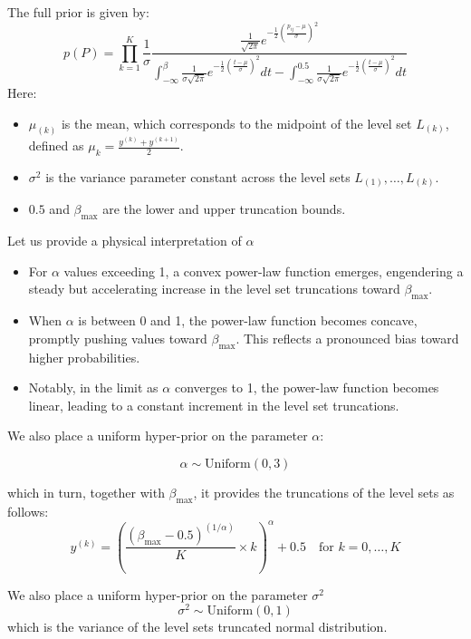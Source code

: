 \documentclass[11pt]{amsart}
\begin{document}
The full prior is given by:
\[
p(P) = \prod_{k=1}^K \frac{1}{\sigma} \frac{\frac{1}{\sqrt{2\pi}} e^{-\frac{1}{2}\left(\frac{p_{ij} - \mu}{\sigma}\right)^2}}{\int_{-\infty}^\beta \frac{1}{\sigma\sqrt{2\pi}} e^{-\frac{1}{2}\left(\frac{t- \mu}{\sigma}\right)^2 }dt -\int_{-\infty}^{0.5} \frac{1}{\sigma\sqrt{2\pi}} e^{-\frac{1}{2}\left(\frac{t- \mu}{\sigma}\right)^2 }dt}
\]
Here:
\begin{itemize}
\item $\mu_{(k)}$ is the mean, which corresponds to the midpoint of the level set $L_{(k)}$, defined as $\mu_{k} = \frac{y^{(k)}+y^{(k+1)}}{2}$.
\item $\sigma^{2}$ is the variance parameter constant across the level sets $L_{(1)},\ldots,L_{(k)}$.
\item $0.5$ and $\beta_{\max}$ are the lower and upper truncation bounds.
\end{itemize}

Let us provide a physical interpretation of $\alpha$
\begin{itemize}
    \item For \(\alpha\) values exceeding 1, a convex power-law function emerges, engendering a steady but accelerating increase in the level set truncations toward \(\beta_{\max}\).
    
    \item When \(\alpha\) is between 0 and 1, the power-law function becomes concave, promptly pushing values toward \(\beta_{\max}\). This reflects a pronounced bias toward higher probabilities.
    
    \item Notably, in the limit as \(\alpha\) converges to 1, the power-law function becomes linear, leading to a constant increment in the level set truncations.
\end{itemize}




We also place a uniform hyper-prior on the parameter $\alpha$:

\[
\alpha \sim \text{Uniform}(0, 3)
\]

which in turn, together with $\beta_{\max}$, it provides the truncations of the level sets as follows:
\begin{equation}
\label{eq:truncations}
y^{(k)} = \left( \frac{(\beta_{\max} - 0.5)^{(1/\alpha)}}{K} \times k \right)^\alpha + 0.5 \quad \text{for } k = 0, \ldots, K
\end{equation}

We also place a uniform hyper-prior on the parameter $\sigma^2$
\[
\sigma^2 \sim \text{Uniform}(0, 1)
\]
which is the variance of the level sets truncated normal distribution.
\end{document}
